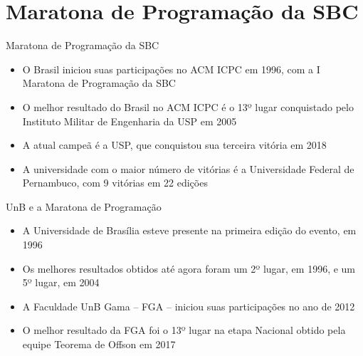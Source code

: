 \section{Maratona de Programação da SBC}

\begin{frame}[fragile]{Maratona de Programação da SBC}

    \begin{itemize}
        \item O Brasil iniciou suas participações no ACM ICPC em 1996, com a I Maratona de
            Programação da SBC
        \item O melhor resultado do Brasil no ACM ICPC é o 13º lugar conquistado pelo 
            Instituto Militar de Engenharia da USP em 2005
        \item A atual campeã é a USP, que conquistou sua terceira vitória em 2018
        \item A universidade com o maior número de vitórias é a Universidade Federal de
            Pernambuco, com 9 vitórias em 22 edições
    \end{itemize}

\end{frame}

\begin{frame}[fragile]{UnB e a Maratona de Programação}

    \begin{itemize}
        \item A Universidade de Brasília esteve presente na primeira edição do evento, em 1996
        \item Os melhores resultados obtidos até agora foram um 2º lugar, em 1996, e um 
            5º lugar, em 2004
        \item A Faculdade UnB Gama -- FGA -- iniciou suas participações no ano de 2012
        \item O melhor resultado da FGA foi o 13º lugar na etapa Nacional obtido pela equipe 
            Teorema de Offson em 2017
    \end{itemize}

\end{frame}

